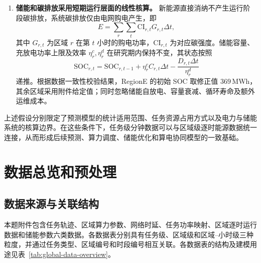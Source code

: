 \documentclass[UTF8,a4paper,zihao=-4]{ctexart}
\begin{document}
\begin{enumerate}[
    label=\textbf{假设\arabic*：},
    leftmargin=5.5em,
    labelsep=0.5em,
    itemsep=0.55em,
    parsep=0pt,
    topsep=0.6em
]
    \item \textbf{储能和碳排放采用短期运行层面的线性核算。}
    新能源直接消纳不产生运行阶段碳排放，系统碳排放仅由电网购电产生，即
    \[
    E
    =
    \sum_{r}\sum_{t}
    \mathrm{CI}_{r,t}G_{r,t}\Delta t,
    \]
    其中 $G_{r,t}$ 为区域 $r$ 在第 $t$ 小时的购电功率，$\mathrm{CI}_{r,t}$ 为对应碳强度。储能容量、充放电功率上限及效率 $\eta_r^{c},\eta_r^{d}$ 在研究期内保持不变，其状态按照
    \[
    \mathrm{SOC}_{r,t}
    =
    \mathrm{SOC}_{r,t-1}
    +
    \eta_r^{c}C_{r,t}\Delta t
    -
    \frac{D_{r,t}\Delta t}{\eta_r^{d}}
    \]
    递推。根据数据一致性校验结果，RegionE 的初始 SOC 取修正值 $369$\,MWh，其余区域采用附件给定值；同时忽略储能自放电、容量衰减、循环寿命及额外运维成本。
\end{enumerate}

上述假设分别限定了预测模型的统计适用范围、任务资源占用方式以及电力与储能系统的核算边界。在这些条件下，任务级分钟数据可以与区域级逐时能源数据统一连接，从而形成后续预测、算力调度、储能优化和算电协同模型的一致基础。


\section{数据总览和预处理}
\label{sec:data-overview}

\subsection{数据来源与关联结构}

本题附件包含任务轨迹、区域算力参数、网络时延、任务功率映射、区域逐时运行数据和储能参数六类数据。各数据表分别具有任务级、区域级和区域--小时级三种粒度，并通过任务类型、区域编号和时段编号相互关联。各数据表的结构及建模用途见表~\ref{tab:global-data-overview}。
\end{document}
